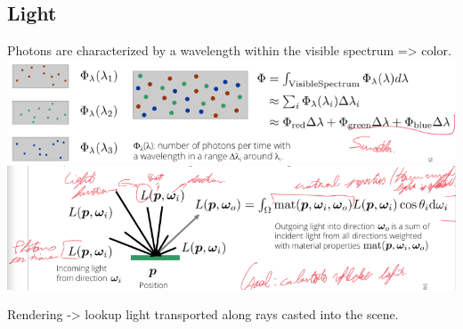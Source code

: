 \documentclass{article}
\begin{document}
\subsection{Light}
Photons are characterized by a wavelength within the visible spectrum => color.\\

\includegraphics{image2.png}
\includegraphics{image3.png}

Rendering -> lookup light transported along rays casted into the scene.
\newpage
\end{document}
